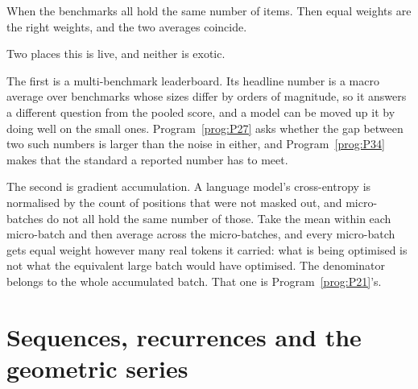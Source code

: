 \begin{fr}
\begin{ansblock}
When the benchmarks all hold the same number of items. Then equal weights are
the right weights, and the two averages coincide.
\end{ansblock}

\begin{aibox}
Two places this is live, and neither is exotic.

The first is a multi-benchmark leaderboard. Its headline number is a macro
average over benchmarks whose sizes differ by orders of magnitude, so it
answers a different question from the pooled score, and a model can be moved
up it by doing well on the small ones. Program~\ref{prog:P27} asks whether the
gap between two such numbers is larger than the noise in either, and
Program~\ref{prog:P34} makes that the standard a reported number has to meet.

The second is gradient accumulation. A language model's cross-entropy is
normalised by the count of positions that were not masked out, and
micro-batches do not all hold the same number of those. Take the mean within
each micro-batch and then average across the micro-batches, and every
micro-batch gets equal weight however many real tokens it carried: what is
being optimised is not what the equivalent large batch would have optimised.
The denominator belongs to the whole accumulated batch. That one is
Program~\ref{prog:P21}'s.
\end{aibox}
\end{fr}


\section{Sequences, recurrences and the geometric series}
\label{sec:F04-sequences}

